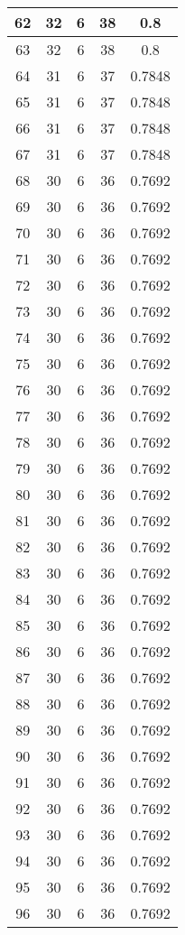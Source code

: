 \documentclass[letterpaper, 12pt]{article}
\begin{document}
\begin{longtable}{|c|c|c|c|c|}
\hline
62 & 32 & 6 & 38 & 0.8 \\
\hline
63 & 32 & 6 & 38 & 0.8 \\
\hline
64 & 31 & 6 & 37 & 0.7848 \\
\hline
65 & 31 & 6 & 37 & 0.7848 \\
\hline
66 & 31 & 6 & 37 & 0.7848 \\
\hline
67 & 31 & 6 & 37 & 0.7848 \\
\hline
68 & 30 & 6 & 36 & 0.7692 \\
\hline
69 & 30 & 6 & 36 & 0.7692 \\
\hline
70 & 30 & 6 & 36 & 0.7692 \\
\hline
71 & 30 & 6 & 36 & 0.7692 \\
\hline
72 & 30 & 6 & 36 & 0.7692 \\
\hline
73 & 30 & 6 & 36 & 0.7692 \\
\hline
74 & 30 & 6 & 36 & 0.7692 \\
\hline
75 & 30 & 6 & 36 & 0.7692 \\
\hline
76 & 30 & 6 & 36 & 0.7692 \\
\hline
77 & 30 & 6 & 36 & 0.7692 \\
\hline
78 & 30 & 6 & 36 & 0.7692 \\
\hline
79 & 30 & 6 & 36 & 0.7692 \\
\hline
80 & 30 & 6 & 36 & 0.7692 \\
\hline
81 & 30 & 6 & 36 & 0.7692 \\
\hline
82 & 30 & 6 & 36 & 0.7692 \\
\hline
83 & 30 & 6 & 36 & 0.7692 \\
\hline
84 & 30 & 6 & 36 & 0.7692 \\
\hline
85 & 30 & 6 & 36 & 0.7692 \\
\hline
86 & 30 & 6 & 36 & 0.7692 \\
\hline
87 & 30 & 6 & 36 & 0.7692 \\
\hline
88 & 30 & 6 & 36 & 0.7692 \\
\hline
89 & 30 & 6 & 36 & 0.7692 \\
\hline
90 & 30 & 6 & 36 & 0.7692 \\
\hline
91 & 30 & 6 & 36 & 0.7692 \\
\hline
92 & 30 & 6 & 36 & 0.7692 \\
\hline
93 & 30 & 6 & 36 & 0.7692 \\
\hline
94 & 30 & 6 & 36 & 0.7692 \\
\hline
95 & 30 & 6 & 36 & 0.7692 \\
\hline
96 & 30 & 6 & 36 & 0.7692 \\

\end{longtable}
\end{document}
